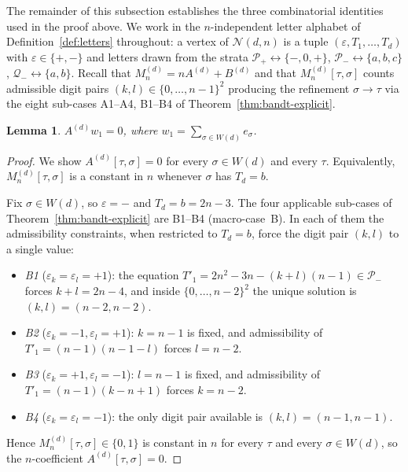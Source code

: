 \documentclass{amsart}
\newtheorem{lemma}[theorem]{Lemma}
\theoremstyle{definition}
\theoremstyle{remark}
\begin{document}

The remainder of this subsection establishes the three
combinatorial identities used in the proof above.  We work in
the $n$-independent letter alphabet of
Definition~\ref{def:letters} throughout: a vertex of
$\mathcal{N}(d, n)$ is a tuple $(\varepsilon, T_1, \ldots, T_d)$
with $\varepsilon \in \{+, -\}$ and letters drawn from the
strata $\mathcal{P}_+ \leftrightarrow \{-, 0, +\}$,
$\mathcal{P}_- \leftrightarrow \{a, b, c\}$,
$\mathcal{Q}_- \leftrightarrow \{a, b\}$.  Recall that
$M_n^{(d)} = n A^{(d)} + B^{(d)}$ and that
$M_n^{(d)}[\tau, \sigma]$ counts admissible digit pairs
$(k, l) \in \{0, \ldots, n-1\}^2$ producing the refinement
$\sigma \to \tau$ via the eight sub-cases A1--A4, B1--B4 of
Theorem~\ref{thm:bandt-explicit}.

\begin{lemma}\label{lem:Aw1-zero}
$A^{(d)} w_1 = 0$, where $w_1 = \sum_{\sigma \in W(d)} e_\sigma$.
\end{lemma}

\begin{proof}
We show $A^{(d)}[\tau, \sigma] = 0$ for every $\sigma \in W(d)$
and every $\tau$.  Equivalently, $M_n^{(d)}[\tau, \sigma]$ is a
constant in $n$ whenever $\sigma$ has $T_d = b$.

Fix $\sigma \in W(d)$, so $\varepsilon = -$ and $T_d = b = 2n-3$.
The four applicable sub-cases of Theorem~\ref{thm:bandt-explicit}
are B1--B4 (macro-case~B).  In each of them the admissibility
constraints, when restricted to $T_d = b$, force the digit pair
$(k, l)$ to a single value:
\begin{itemize}
\item \emph{B1} \textup{($\varepsilon_k = \varepsilon_l = +1$)}:
  the equation $T'_1 = 2n^2 - 3n - (k+l)(n-1) \in \mathcal{P}_-$
  forces $k + l = 2n - 4$, and inside $\{0, \ldots, n-2\}^2$ the
  unique solution is $(k, l) = (n-2, n-2)$.
\item \emph{B2} \textup{($\varepsilon_k = -1, \varepsilon_l = +1$)}:
  $k = n-1$ is fixed, and admissibility of $T'_1 = (n-1)(n-1-l)$
  forces $l = n-2$.
\item \emph{B3} \textup{($\varepsilon_k = +1, \varepsilon_l = -1$)}:
  $l = n-1$ is fixed, and admissibility of
  $T'_1 = (n-1)(k - n + 1)$ forces $k = n-2$.
\item \emph{B4} \textup{($\varepsilon_k = \varepsilon_l = -1$)}:
  the only digit pair available is $(k, l) = (n-1, n-1)$.
\end{itemize}
Hence $M_n^{(d)}[\tau, \sigma] \in \{0, 1\}$ is constant in $n$
for every $\tau$ and every $\sigma \in W(d)$, so the
$n$-coefficient $A^{(d)}[\tau, \sigma] = 0$.
\end{proof}
\end{document}
